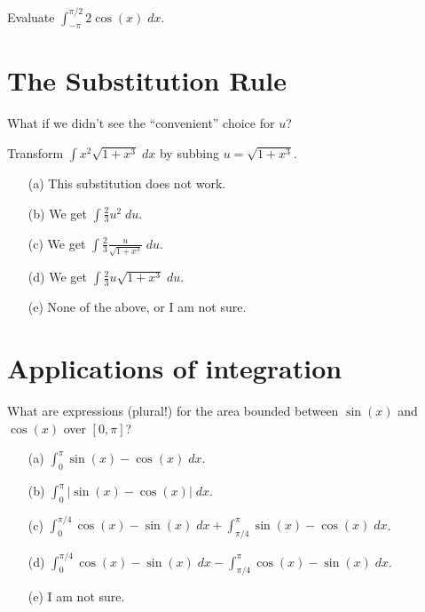 \documentclass[14pt]{beamer}
\begin{document}
\begin{frame}
  Evaluate \(\int_{-\pi}^{\pi/2} 2 \cos(x) \;dx\).
\end{frame}

\section{The Substitution Rule}
\begin{frame}[t]
  What if we didn't see the ``convenient'' choice for \(u\)? 

  Transform \(\int x^{2} \sqrt{ 1 + x^{3} } \;dx\) by subbing \(u = \sqrt{ 1 + x^{3} }\).

  \begin{enumerate} \setlength\itemsep{1ex}
    \item[(a)] This substitution does not work.
    \item[(b)] We get \(\int \frac{2}{3} u^{2} \;du\). 
    \item[(c)] We get \(\int \frac{2}{3} \frac{u}{\sqrt{ 1 + x^{3} }} \;du\). 
  \item[(d)] We get \(\int \frac{2}{3} u \sqrt{1 + x^{3}} \;du\). 
    \item[(e)] None of the above, or I am not sure.
  \end{enumerate}
\end{frame}

\section{Applications of integration}

\begin{frame}[t]
  What are expressions (plural!) for the area bounded between \(\sin(x)\) and \(\cos(x)\) over \([0, \pi]\)?

  \begin{enumerate} \setlength\itemsep{1ex}
    \item[(a)] \(\int_{0}^{\pi} \sin(x) - \cos(x) \;dx\).
    \item[(b)] \(\int_{0}^{\pi} |\sin(x) - \cos(x)| \;dx\).
    \item[(c)] \(\int_{0}^{\pi/4} \cos(x) - \sin(x) \;dx + \int_{\pi/4}^{\pi} \sin(x) - \cos(x) \;dx\).
    \item[(d)] \(\int_{0}^{\pi/4} \cos(x) - \sin(x) \;dx - \int_{\pi/4}^{\pi} \cos(x) - \sin(x) \;dx\).
    \item[(e)] I am not sure. 
  \end{enumerate}
\end{frame}
\end{document}

